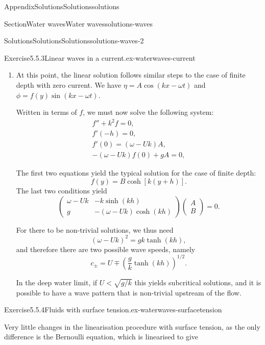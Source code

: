 \documentclass[oneside,10pt,]{book}
\numberwithin{equation}{section}
\begin{document}
\begin{appendixptx}{Appendix}{Solutions}{}{Solutions}{}{}{solutions}
\begin{sectionptx}{Section}{Water waves}{}{Water waves}{}{}{solutions-waves}
\begin{solutions-subsection-numberless}{Solutions}{Solutions}{}{Solutions}{}{}{solutions-waves-2}
\begin{divisionsolution}{Exercise}{5.5.3}{Linear waves in a current.}{ex-waterwaves-current}
\begin{enumerate}[font=\bfseries,label=(\alph*),ref=\alph*]
\item[(c)]\noindent\hypertarget{ex-waterwaves-current-5-2-main}{}At this point, the linear solution follows similar steps to the case of finite depth with zero current. We have \(\eta = A\cos(kx - \omega t)\) and \(\phi = f(y) \sin(kx - \omega t)\).%
\par
Written in terms of \(f\), we must now solve the following system:%
\begin{gather*}
f'' + k^2 f = 0, \\
f'(-h) = 0, \\
f'(0) = (\omega - Uk)A, \\
-(\omega - Uk) f(0) + gA = 0, 
\end{gather*}
%
\par
The first two equations yield the typical solution for the case of finite depth:%
\begin{equation*}
f(y) = B \cosh[k(y + h)].
\end{equation*}
The last two conditions yield%
\begin{equation}
\begin{pmatrix}
\omega - Uk & -k \sinh (kh) \\
g & -(\omega - Uk)\cosh(kh)
\end{pmatrix}
\begin{pmatrix}
A \\ B
\end{pmatrix}
= 0.\label{ex-waterwaves-current-5-2-3-2}
\end{equation}
%
\par
For there to be non-trivial solutions, we thus need%
\begin{equation*}
(\omega - Uk)^2 = gk \tanh(kh),
\end{equation*}
and therefore there are two possible wave speeds, namely%
\begin{equation*}
c_\pm = U \mp \left(\frac{g}{k}\tanh(kh)\right)^{1/2}.
\end{equation*}
%
\par
In the deep water limit, if \(U < \sqrt{g/k}\) this yields subcritical solutions, and it is possible to have a wave pattern that is non-trivial upstream of the flow.%
\end{enumerate}%
\end{divisionsolution}%
\begin{divisionsolution}{Exercise}{5.5.4}{Fluids with surface tension.}{ex-waterwaves-surfacetension}%
\par\smallskip%
\noindent\hypertarget{ex-waterwaves-surfacetension-3-main}{}Very little changes in the linearisation procedure with surface tension, as the only difference is the Bernoulli equation, which is linearised to give%

\end{divisionsolution}
\end{solutions-subsection-numberless}
\end{sectionptx}
\end{appendixptx}
\end{document}

